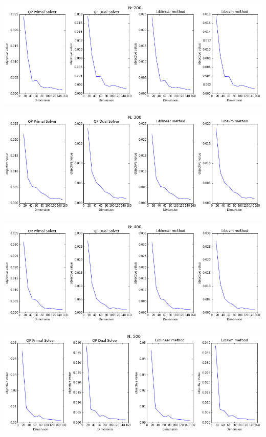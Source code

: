 \documentclass[12pt, a4paper]{article}
\begin{document}
			\begin{center}
				\includegraphics[width=18cm]{1par_obj_N200.png}
			\end{center}

			\begin{center}
				\includegraphics[width=18cm]{1par_obj_N300.png}
			\end{center}

			\begin{center}
				\includegraphics[width=18cm]{1par_obj_N400.png}
			\end{center}

			\begin{center}
				\includegraphics[width=18cm]{1par_obj_N500.png}
			\end{center}
\end{document}
